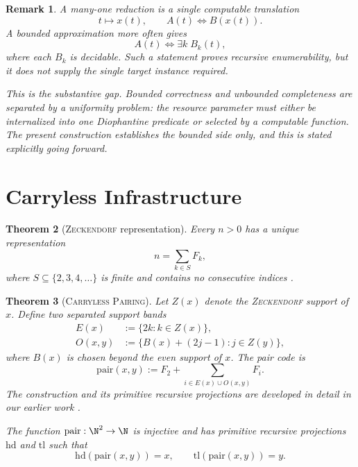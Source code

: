 \documentclass[letterpaper,10pt]{article}
\theoremstyle{upright}
\theoremstyle{upright}
\newtheorem{theorem}{Theorem}[section]
\newtheorem{remark}[theorem]{Remark}
\begin{document}
\begin{remark}
	A \emph{many-one reduction} is a single computable translation
	\begin{equation}
		t\longmapsto x(t),
		\qquad
		A(t)\iff B(x(t)).
	\end{equation}
	A bounded approximation more often gives
	\begin{equation}
		A(t)\iff \exists k\;B_k(t),
	\end{equation}
	where each $B_k$ is decidable. Such a statement proves recursive enumerability, but it does not supply the single target instance required.

	This is the substantive gap. Bounded correctness and unbounded completeness are separated by a uniformity problem: the resource parameter must either be internalized into one Diophantine predicate or selected by a computable function. The present construction establishes the bounded side only, and this is stated explicitly going forward.
\end{remark}

\section{Carryless Infrastructure}
\label{sec:arith-infra}


\begin{theorem}[\textsc{Zeckendorf} representation]
\label{thm:zeckendorf}
	Every $n>0$ has a unique representation
	\begin{equation}
		n=\sum_{k\in S}F_k,
	\end{equation}
	where $S\subseteq\{2,3,4,\ldots\}$ is finite and contains no consecutive indices \citep{zeckendorf}.
\end{theorem}

\begin{theorem}[\textsc{Carryless Pairing}]
\label{def:carryless-pairing}
	Let $Z(x)$ denote the \textsc{Zeckendorf} support of $x$. Define two separated support bands
	\begin{align}
		E(x)&:=\{2k:k\in Z(x)\},\\
		O(x,y)&:=\{B(x)+(2j-1):j\in Z(y)\},
	\end{align}
	where $B(x)$ is chosen beyond the even support of $x$. The pair code is
	\begin{equation}
		\mathrm{pair}(x,y):=F_2+\sum_{i\in E(x)\cup O(x,y)}F_i.
	\end{equation}
	The construction and its primitive recursive projections are developed in detail in our earlier work \citep{rosko2025fibonacci}.

	The function $\mathrm{pair}:\N^2\to\N$ is injective and has primitive recursive projections $\mathrm{hd}$ and $\mathrm{tl}$ such that
	\begin{equation}
		\mathrm{hd}(\mathrm{pair}(x,y))=x,
		\qquad
		\mathrm{tl}(\mathrm{pair}(x,y))=y.
	\end{equation}
\end{theorem}
\end{document}
